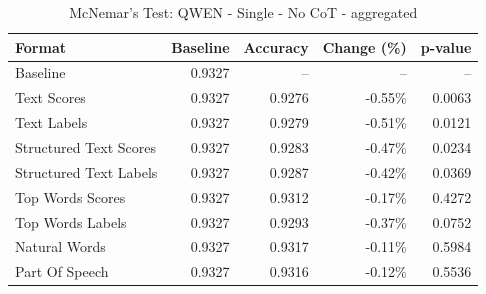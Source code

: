 \begin{table}[htbp]
\centering
\caption{McNemar's Test: QWEN - Single - No CoT - aggregated}
\label{tab:qwen-single-no_chain_of_thought-aggregated}
\begin{tabular}{lrrrr}
\toprule
Format & Baseline & Accuracy & Change (\%) & p-value \\
\midrule
Baseline & 0.9327 & -- & -- & -- \\
Text Scores & 0.9327 & 0.9276 & -0.55\% & 0.0063 \\
Text Labels & 0.9327 & 0.9279 & -0.51\% & 0.0121 \\
Structured Text Scores & 0.9327 & 0.9283 & -0.47\% & 0.0234 \\
Structured Text Labels & 0.9327 & 0.9287 & -0.42\% & 0.0369 \\
Top Words Scores & 0.9327 & 0.9312 & -0.17\% & 0.4272 \\
Top Words Labels & 0.9327 & 0.9293 & -0.37\% & 0.0752 \\
Natural Words & 0.9327 & 0.9317 & -0.11\% & 0.5984 \\
Part Of Speech & 0.9327 & 0.9316 & -0.12\% & 0.5536 \\
\bottomrule
\end{tabular}
\end{table}